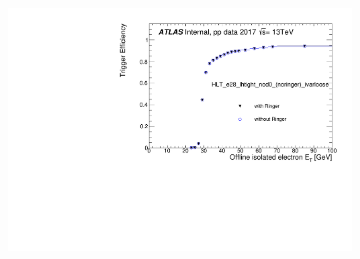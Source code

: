 \begin{figure}[h!tb]
  \begin{center}
  \begin{subfigure}[c]{.48\textwidth}
  \centering
  \includegraphics[width=\textwidth]{sections/operation/figures/efficiencies/eff_EGAM1_e28_ringer_and_noringer_2017_after_ts1_HLT_et.pdf}
  \caption{}%


\end{subfigure}
\end{center}
\end{figure}
